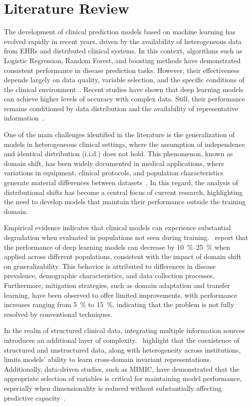 \documentclass[utf8]{FrontiersinHarvard} %
\begin{document}
\section{Literature Review}

The development of clinical prediction models based on machine learning has evolved rapidly in recent years, driven by the availability of heterogeneous data from EHRs and distributed clinical systems. In this context, algorithms such as Logistic Regression, Random Forest, and boosting methods have demonstrated consistent performance in disease prediction tasks. However, their effectiveness depends largely on data quality, variable selection, and the specific conditions of the clinical environment~\citet{Abdillah2024}. Recent studies have shown that deep learning models can achieve higher levels of accuracy with complex data. Still, their performance remains conditioned by data distribution and the availability of representative information~\citet{Denada2025}.

One of the main challenges identified in the literature is the generalization of models in heterogeneous clinical settings, where the assumption of independence and identical distribution (i.i.d.) does not hold. This phenomenon, known as domain shift, has been widely documented in medical applications, where variations in equipment, clinical protocols, and population characteristics generate material differences between datasets~\citet{Matta2024}. In this regard, the analysis of distributional shifts has become a central focus of current research, highlighting the need to develop models that maintain their performance outside the training domain.

Empirical evidence indicates that clinical models can experience substantial degradation when evaluated in populations not seen during training.~\citet{Musa2026} report that the performance of deep learning models can decrease by 10~\%--25~\% when applied across different populations, consistent with the impact of domain shift on generalizability. This behavior is attributed to differences in disease prevalence, demographic characteristics, and data collection processes. Furthermore, mitigation strategies, such as domain adaptation and transfer learning, have been observed to offer limited improvements, with performance increases ranging from 5~\% to 15~\%, indicating that the problem is not fully resolved by conventional techniques.

In the realm of structured clinical data, integrating multiple information sources introduces an additional layer of complexity.~\citep{Chen2025} highlight that the coexistence of structured and unstructured data, along with heterogeneity across institutions, limits models' ability to learn cross-domain invariant representations. Additionally, data-driven studies, such as MIMIC, have demonstrated that the appropriate selection of variables is critical for maintaining model performance, especially when dimensionality is reduced without substantially affecting predictive capacity~\citet{Wang2025}.
\end{document}
